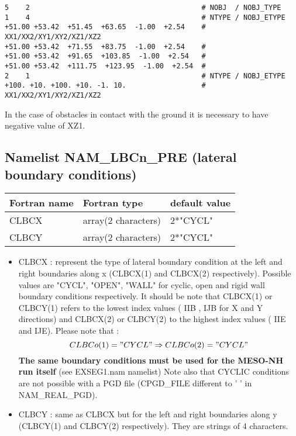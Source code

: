 \begin{verbatim}
5    2                                         # NOBJ  / NOBJ_TYPE
1    4                                         # NTYPE / NOBJ_ETYPE
+51.00 +53.42  +51.45  +63.65  -1.00  +2.54    # XX1/XX2/XY1/XY2/XZ1/XZ2
+51.00 +53.42  +71.55  +83.75  -1.00  +2.54    #
+51.00 +53.42  +91.65  +103.85  -1.00  +2.54   #
+51.00 +53.42  +111.75  +123.95  -1.00  +2.54  #
2    1                                         # NTYPE / NOBJ_ETYPE
+100. +10. +100. +10. -1. 10.                  # XX1/XX2/XY1/XY2/XZ1/XZ2
\end{verbatim}
In the case of obstacles in contact with the ground it is necessary to have negative value of XZ1.

\subsection{Namelist NAM\_LBCn\_PRE (lateral boundary conditions)} 

\begin{center}
\begin{tabular} {|l|l|l|}
\hline
Fortran name & Fortran type & default value \\
\hline
CLBCX    & array(2 characters)  &  2*"CYCL"  \\
CLBCY    & array(2 characters)  &  2*"CYCL"  \\
\hline
\end{tabular}
\end{center}

\begin{itemize}

\item
CLBCX  : represent the type of lateral boundary
condition at the left and right boundaries along x (CLBCX(1) and CLBCX(2)
respectively). Possible values are "CYCL", "OPEN", "WALL" for cyclic, open and
rigid wall boundary conditions respectively. It should be note that CLBCX(1) or CLBCY(1)
refers to the lowest index values ( IIB , IJB for X and Y directions) and
CLBCX(2) or CLBCY(2) to the highest index values ( IIE  and IJE). Please note
that :  
$$CLBCo(1) ="CYCL" \Rightarrow CLBCo(2) ="CYCL" $$
  {\bf  The same boundary conditions must be used for the MESO-NH run itself} (see EXSEG1.nam namelist)
Note also that CYCLIC conditions are not possible  
with a PGD file (CPGD\_FILE different to '  ' in NAM\_REAL\_PGD).
\item
CLBCY  : same as CLBCX but for the left and right boundaries along y (CLBCY(1) and CLBCY(2) respectively). They are strings of 4 characters.
\end{itemize}  


